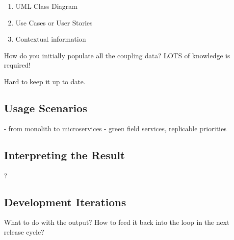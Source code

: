 \begin{enumerate}
\item UML Class Diagram
\item Use Cases or User Stories
\item Contextual information
\end{enumerate}


How do you initially populate all the coupling data? LOTS of knowledge is required!

Hard to keep it up to date.


\subsection{Usage Scenarios}


- from monolith to microservices
- green field services, replicable priorities

\subsection{Interpreting the Result}

?

\subsection{Development Iterations}

What to do with the output? How to feed it back into the loop in the next release cycle?
